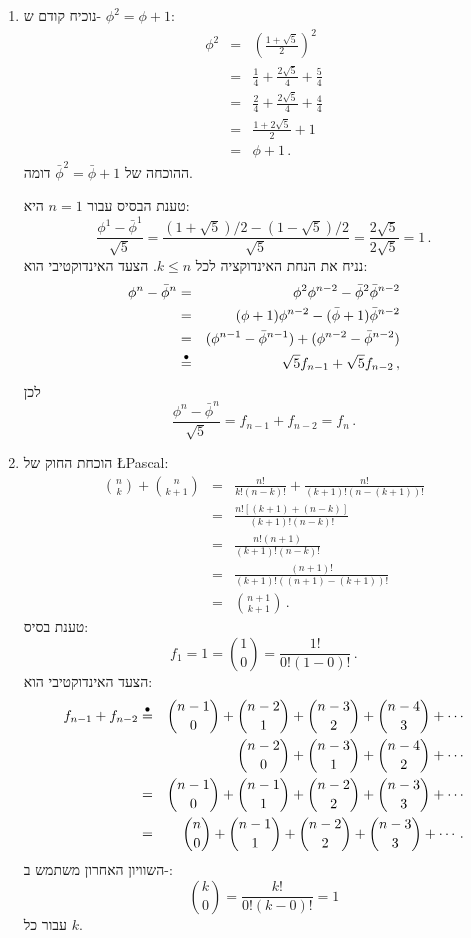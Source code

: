 \begin{enumerate}
\item
נוכיח קודם ש-%
$\phi^2=\phi+1$:
\vspace*{-8pt}
\begin{eqnarray*}
\phi^2 &=& \left(\frac{1+\sqrt{5}}{2}\right)^2\\
&=& \frac{1}{4} + \frac{2\sqrt{5}}{4} + \frac{5}{4}\\
&=& \frac{2}{4} + \frac{2\sqrt{5}}{4} + \frac{4}{4}\\
&=& \frac{1+2\sqrt{5}}{2} + 1\\
&=&\phi + 1\,.
\end{eqnarray*}
ההוכחה של
$\bar{\phi}^2=\bar{\phi}+1$
דומה.

טענת הבסיס עבור
$n=1$
היא:
\[
\frac{\phi^1 - \bar{\phi}^1}{\sqrt{5}}=\frac{(1+\sqrt{5})/2-(1-\sqrt{5})/2}{\sqrt{5}}=\frac{2\sqrt{5}}{2\sqrt{5}}=1\,.
\]
נניח את הנחת האינדוקציה לכל
$k\leq n$.
הצעד האינדוקטיבי הוא:
\begin{eqnarray*}
\phi^n - \bar{\phi}^n &=& \phi^2\phi^{n-2} - \bar{\phi}^2\bar{\phi}^{n-2}\\
&=&(\phi+1)\phi^{n-2} - (\bar{\phi}+1)\bar{\phi}^{n-2}\\
&=&(\phi^{n-1} - \bar{\phi}^{n-1}) + (\phi^{n-2} - \bar{\phi}^{n-2})\\
&\stackrel{\bullet}{=}&\sqrt{5}f_{n-1} + \sqrt{5}f_{n-2}\,,
\end{eqnarray*}
לכן
\[
\frac{\phi^n - \bar{\phi}^n}{\sqrt{5}} = f_{n-1} + f_{n-2} = f_n\,.
\]

\item
הוכחת החוק של
\L{Pascal}:
\begin{eqnarray*}
{n \choose k} + {n \choose k+1} &=& \frac{n!}{k!(n-k)!} + \frac{n!}{(k+1)!(n-(k+1))!}\\
&=&\frac{n![(k+1)+(n-k)]}{(k+1)!(n-k)!}\\
&=&\frac{n!(n+1)}{(k+1)!(n-k)!}\\
&=&\frac{(n+1)!}{(k+1)!((n+1)-(k+1))!}\\
&=&{n+1 \choose k+1}\,.
\end{eqnarray*}
טענת בסיס:
\[
f_1 = 1 = {1 \choose 0} = \frac{1!}{0!(1-0)!}\,.
\]
הצעד האינדוקטיבי הוא:
\begin{eqnarray*}
f_{n-1} + f_{n-2} &\stackrel{\bullet}{=}& {n-1 \choose 0} + {n-2 \choose 1} + {n-3 \choose 2} + {n-4 \choose 3} + \cdots\\
&&\hspace{5em}{n-2 \choose 0} + {n-3 \choose 1} + {n-4 \choose 2} + \cdots\\
&=&{n-1 \choose 0} + {n-1 \choose 1} + {n-2 \choose 2} + {n-3 \choose 3} + \cdots\\
&=&{n \choose 0} + {n-1 \choose 1} + {n-2 \choose 2} + {n-3 \choose 3} + \cdots.
\end{eqnarray*}
השוויון האחרון משתמש ב-:
\[
{k \choose 0} = \frac{k!}{0!(k-0)!} = 1
\]
עבור כל
$k$.

\end{enumerate}
